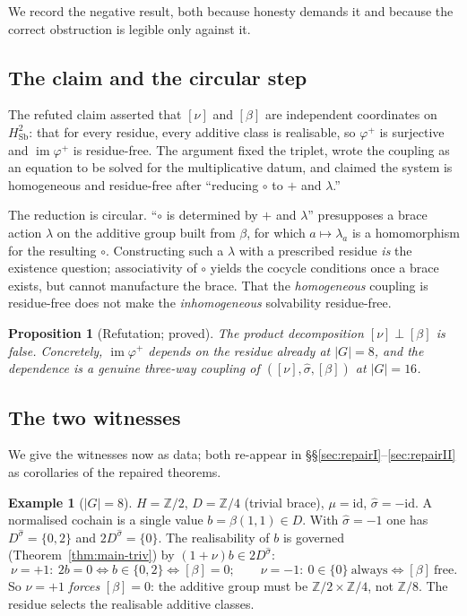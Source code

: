 \documentclass[11pt,reqno]{amsart}
\theoremstyle{plain}
\newtheorem{proposition}[theorem]{Proposition}
\theoremstyle{definition}
\newtheorem{example}[theorem]{Example}
\newcommand{\Sb}{\mathrm{Sb}}
\newcommand{\Z}{\mathbb{Z}}
\newcommand{\id}{\mathrm{id}}
\newcommand{\im}{\operatorname{im}}
\newcommand{\shat}{\widehat{\sigma}}
\begin{document}
We record the negative result, both because honesty demands it and because the correct
obstruction is legible only against it.

\subsection{The claim and the circular step}
The refuted claim asserted that $[\nu]$ and $[\beta]$ are independent coordinates on
$H^2_{\Sb}$: that for every residue, every additive class is realisable, so $\varphi^{+}$
is surjective and $\im\varphi^{+}$ is residue-free. The argument fixed the triplet, wrote
the coupling as an equation to be solved for the multiplicative datum, and claimed the
system is homogeneous and residue-free after ``reducing $\circ$ to $+$ and $\lambda$.''

The reduction is circular. ``$\circ$ is determined by $+$ and $\lambda$'' presupposes a
brace action $\lambda$ on the additive group built from $\beta$, for which $a\mapsto
\lambda_a$ is a homomorphism for the resulting $\circ$. Constructing such a $\lambda$ with
a prescribed residue \emph{is} the existence question; associativity of $\circ$ yields the
cocycle conditions once a brace exists, but cannot manufacture the brace. That the
\emph{homogeneous} coupling is residue-free does not make the \emph{inhomogeneous}
solvability residue-free.

\begin{proposition}[Refutation; proved]\label{prop:refut}
The product decomposition $[\nu]\perp[\beta]$ is false. Concretely, $\im\varphi^{+}$ depends
on the residue already at $|G|=8$, and the dependence is a genuine three-way coupling of
$([\nu],\shat,[\beta])$ at $|G|=16$.
\end{proposition}

\subsection{The two witnesses}
We give the witnesses now as data; both re-appear in \S\S\ref{sec:repairI}--\ref{sec:repairII}
as corollaries of the repaired theorems.

\begin{example}[$|G|=8$]\label{ex:g8}
$H=\Z/2$, $D=\Z/4$ (trivial brace), $\mu=\id$, $\shat=-\id$. A normalised cochain is a
single value $b=\beta(1,1)\in D$. With $\shat=-1$ one has $D^{\shat}=\{0,2\}$ and
$2D^{\shat}=\{0\}$. The realisability of $b$ is governed (Theorem~\ref{thm:main-triv}) by
$(1+\nu)b\in 2D^{\shat}$:
\[
\nu=+1:\ 2b=0\iff b\in\{0,2\}\iff[\beta]=0;\qquad
\nu=-1:\ 0\in\{0\}\ \text{always}\iff[\beta]\ \text{free}.
\]
So $\nu=+1$ \emph{forces} $[\beta]=0$: the additive group must be $\Z/2\times\Z/4$, not
$\Z/8$. The residue selects the realisable additive classes.
\end{example}
\end{document}
